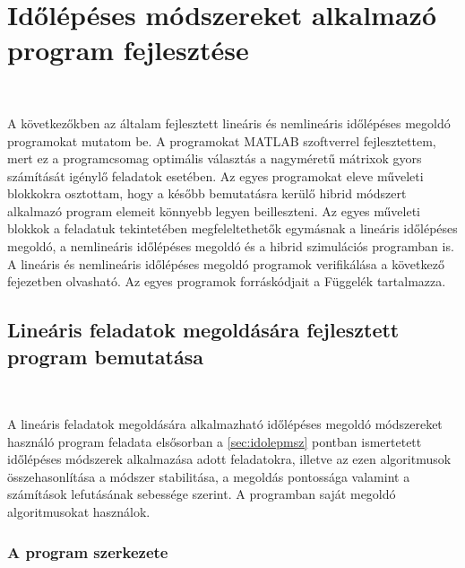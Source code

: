 \chapter[Időlépéses program fejlesztése]{Időlépéses módszereket alkalmazó program fejlesztése}\label{chap: lin+nemlin progi}

{\ }

A következőkben az általam fejlesztett lineáris és nemlineáris időlépéses megoldó programokat mutatom be. A programokat MATLAB szoftverrel fejlesztettem, mert ez a programcsomag optimális választás a nagyméretű mátrixok gyors számítását igénylő feladatok esetében. Az egyes programokat eleve műveleti blokkokra osztottam, hogy a később bemutatásra kerülő hibrid módszert alkalmazó program elemeit könnyebb legyen beilleszteni. Az egyes műveleti blokkok a  feladatuk tekintetében megfeleltethetők egymásnak a  lineáris időlépéses megoldó, a nemlineáris időlépéses megoldó és a hibrid szimulációs  programban is. A lineáris és nemlineáris  időlépéses megoldó programok verifikálása a következő  fejezetben   olvasható.  Az egyes programok forráskódjait a Függelék tartalmazza.

\section{Lineáris feladatok megoldására fejlesztett program bemutatása}\label{sec: lin progi}

{\ }

A lineáris feladatok megoldására alkalmazható időlépéses megoldó módszereket használó program feladata elsősorban a \ref{sec:idolepmsz} pontban ismertetett időlépéses módszerek alkalmazása adott feladatokra, illetve az ezen algoritmusok összehasonlítása a módszer stabilitása, a megoldás pontossága valamint a számítások lefutásának sebessége szerint. A programban saját megoldó algoritmusokat használok.

\subsection{A program szerkezete}\label{subsec: lin prog szerk}

{\ }

